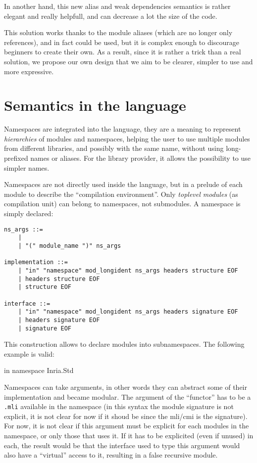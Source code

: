 \documentclass[11pt,a4paper]{article}
\begin{document}
In another hand, this new alias and weak dependencies semantics is rather
elegant and really helpfull, and can decrease a lot the size of the code.

This solution works thanks to the module aliases (which are no longer only
references), and in fact could be used, but it is complex enough to discourage
beginners to create their own. As a result, since it is rather a trick than a
real solution, we propose our own design that we aim to be clearer, simpler to
use and more expressive.

\section{Semantics in the language}

Namespaces are integrated into the language, they are a meaning to represent
\emph{hierarchies} of modules and namespaces, helping the user to use multiple
modules from different libraries, and possibly with the same name, without using
long-prefixed names or aliases. For the library provider, it allows the
possibility to use simpler names.

Namespaces are not directly used inside the language, but in a prelude of each
module to describe the ``compilation environment''. Only \emph{toplevel modules}
(as compilation unit) can belong to namespaces, not submodules. A namespace is
simply declared: 

\begin{verbatim}
ns_args ::=
    | 
    | "(" module_name ")" ns_args

implementation ::=
    | "in" "namespace" mod_longident ns_args headers structure EOF
    | headers structure EOF
    | structure EOF

interface ::=
    | "in" "namespace" mod_longident ns_args headers signature EOF
    | headers signature EOF
    | signature EOF
\end{verbatim}

This construction allows to declare modules into subnamespaces. The following
example is valid:

\begin{OCaml}
in namespace Inria.Std
\end{OCaml}

Namespaces can take arguments, in other words they can abstract some of their
implementation and became modular. The argument of the ``functor'' has to be a
\texttt{.mli} available in the namespace (in this syntax the module signature is
not explicit, it is not clear for now if it shoud be since the mli/cmi is the
signature). For now, it is not clear if this argument must be explicit for each
modules in the namespace, or only those that uses it. If it has to be explicited
(even if unused) in each, the result would be that the interface used to type
this argument would also have a ``virtual'' access to it, resulting in a false
recursive module.
\end{document}
